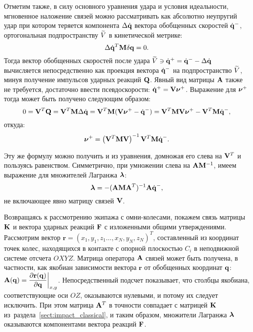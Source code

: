 Отметим также, в силу основного уравнения удара и условия идеальности, мгновенное наложение связей можно рассматривать как абсолютно неупругий удар при котором теряется компонента $\Delta\dot{\mathbf{q}}$ вектора обобщенных скоростей $\dot{\mathbf{q}}^-$, ортогональная подпространству $\widetilde{V}$ в кинетической метрике:
\begin{equation*}
    \Delta\dot{\mathbf{q}}^T\mathbf{M}\delta\mathbf{q} = 0.
\end{equation*}
Тогда вектор обобщенных скоростей после удара $\widetilde{V} \ni \dot{\mathbf{q}}^+ = \dot{\mathbf{q}}^- - \Delta\dot{\mathbf{q}}$ вычисляется непосредственно как проекция вектора $\dot{\mathbf{q}}^-$ на подпространство $\widetilde{V}$, минуя получение импульсов ударных реакций $\mathbf{Q}$. Явный вид матрицы $\mathbf{A}$ также не требуется, достаточно ввести псевдоскорости: $\dot{\mathbf{q}}^+ = \mathbf{V}\boldsymbol{\mathbf{\nu}}^+$.
Выражение для $\boldsymbol{\mathbf{\nu}}^+$ тогда может быть получено следующим образом:
\begin{equation*}
    0 = \mathbf{V}^T\mathbf{Q} = \mathbf{V}^T\mathbf{M}\Delta\dot{\mathbf{q}} = \mathbf{V}^T\mathbf{M}(\mathbf{V}\boldsymbol{\mathbf{\nu}}^+ - \dot{\mathbf{q}}^-) = \mathbf{V}^T\mathbf{M}\mathbf{V}\boldsymbol{\mathbf{\nu}}^+ - \mathbf{V}^T\mathbf{M}\dot{\mathbf{q}}^-,
\end{equation*}
откуда:
\begin{equation*}
\boldsymbol{\mathbf{\nu}}^+ = \left( \mathbf{V}^T\mathbf{M}\mathbf{V} \right)^{-1}\mathbf{V}^T\mathbf{M}\dot{\mathbf{q}}^-.
\end{equation*}

Эту же формулу можно получить и из уравнения, домножая его слева на $\mathbf{V}^T$ и пользуясь равенством. Симметрично, при умножении слева на $\mathbf{A}\mathbf{M}^{-1}$, имеем выражение для множителей Лагранжа $\boldsymbol{\mathbf{\lambda}}$:
\begin{equation*}
    \boldsymbol{\mathbf{\lambda}} = -(\mathbf{A} \mathbf{M} \mathbf{A}^T)^{-1}\mathbf{A}\dot{\mathbf{q}}^-,
\end{equation*}
не включающее явно матрицу связей $\mathbf{V}$.

Возвращаясь к рассмотрению экипажа с омни-колесами, покажем связь матрицы $\mathbf{K}$ и вектора ударных реакций $\mathbf{F}$ с изложенными общими утверждениями.
Рассмотрим вектор $\mathbf{r} = ( x_1, y_1, z_1 \ldots, x_N, y_N, z_N )^T$, составленный из координат точек колес, находящихся в контакте с опорной плоскостью $C_i$ в неподвижной системе отсчета $OXYZ$.
Матрица оператора $\mathbf{A}$ связей может быть получена, в частности, как якобиан зависимости вектора $\mathbf{r}$ от обобщенных координат $\mathbf{q}$: $\mathbf{A}(\mathbf{q}) = \displaystyle\frac{\displaystyle \partial \mathbf{r}(\mathbf{q})}{\displaystyle \partial \mathbf{q}}\bigg|_{x,y}$.
Непосредственный подсчет показывает, что столбцы якобиана, соответствующие оси $OZ$, оказываются нулевыми, и потому их следует исключить.
При этом матрица $\mathbf{A}^T$ в точности совпадает с матрицей $\mathbf{K}$ из~раздела~\ref{sect:impact_classical}, и таким образом, множители Лагранжа $\boldsymbol{\mathbf{\lambda}}$ оказываются компонентами вектора реакций $\mathbf{F}$.
